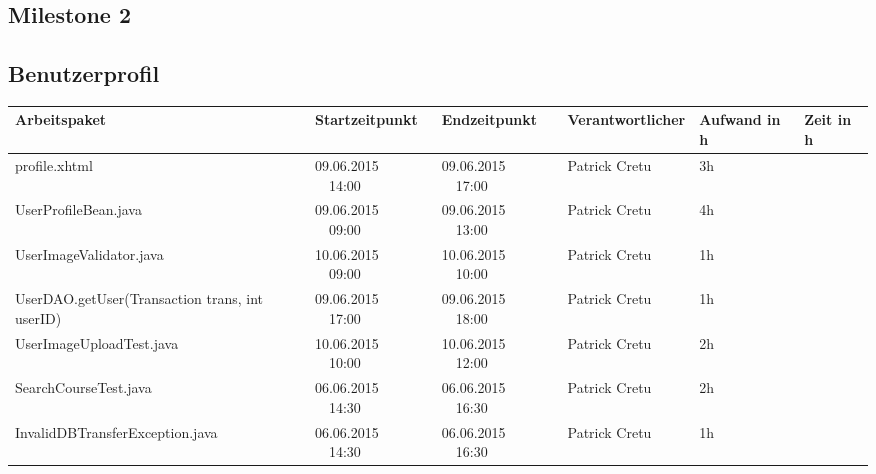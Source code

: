 \begin{landscape}
	\section{Milestone 2}
	
	\subsection{Benutzerprofil}
\begin{tabular}{|p{10.3cm}|p{3.2cm}|p{3.2cm}|p{3.5cm}|p{1.7cm}|p{1.5cm}|}
	\hline  \textbf{Arbeitspaket} & \textbf{Startzeitpunkt} & \textbf{Endzeitpunkt} & \textbf{Verantwortlicher}  & \textbf{Aufwand in h} & \textbf{Zeit in h}\\ 
		\hline   profile.xhtml                                         & 09.06.2015 \ \ 14:00        & 09.06.2015 \ \ 17:00        & Patrick Cretu  &  3h      &\\ 
		\hline   UserProfileBean.java                                  & 09.06.2015 \ \ 09:00        & 09.06.2015 \ \ 13:00        & Patrick Cretu  &  4h      &\\ 
		\hline   UserImageValidator.java                               & 10.06.2015 \ \ 09:00        & 10.06.2015 \ \ 10:00        & Patrick Cretu  &  1h      &\\ 
		\hline   UserDAO.getUser(Transaction trans, int userID)        & 09.06.2015 \ \ 17:00        & 09.06.2015 \ \ 18:00        & Patrick Cretu  &  1h      &\\  
		\hline   UserImageUploadTest.java                              & 10.06.2015 \ \ 10:00        & 10.06.2015 \ \ 12:00        & Patrick Cretu  &  2h      &\\
		\hline   SearchCourseTest.java                                 & 06.06.2015  \ \ 14:30       & 06.06.2015 \ \ 16:30        & Patrick Cretu  &  2h      &\\
		\hline   InvalidDBTransferException.java                       & 06.06.2015  \ \ 14:30       & 06.06.2015 \ \ 16:30        & Patrick Cretu  &  1h      &\\
		\hline 
	\end{tabular} \ \\
	\ \\
	

\end{landscape}
